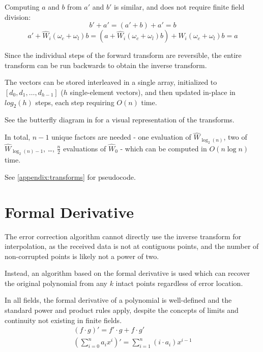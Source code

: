 Computing $a$ and $b$ from $a'$ and $b'$ is similar, and does not require finite field division:
\begin{equation}b' + a' = (a' + b) + a' = b\end{equation}
\begin{equation}a' + \hat{W}_i(\omega_c + \omega_l) b = (a + \hat{W}_i(\omega_c + \omega_l) b) + \hat{W}_i(\omega_c + \omega_l) b = a\end{equation}

Since the individual steps of the forward transform are reversible, the entire transform can be run backwards to obtain the inverse transform.

The vectors can be stored interleaved in a single array, initialized to $[d_0, d_1, \ldots, d_{h - 1}]$ ($h$ single-element vectors), and then updated in-place in $log_2(h)$ steps, each step requiring $O(n)$ time.

See the butterfly diagram in \cite{novel-poly} for a visual representation of the transforms.

In total, $n - 1$ unique factors are needed - one evaluation of $\hat{W}_{\log_2(n)}$, two of $\hat{W}_{\log_2(n) - 1}$, \ldots, $\frac{n}{2}$ evaluations of $\hat{W}_0$ - which can be computed in $O(n \log n)$ time.

See \ref{appendix:transforms} for pseudocode.

\section{Formal Derivative}

The error correction algorithm cannot directly use the inverse transform for interpolation, as the received data is not at contiguous points, and the number of non-corrupted points is likely not a power of two.

Instead, an algorithm based on the formal derivative is used which can recover the original polynomial from any $k$ intact points regardless of error location.

In all fields, the formal derivative of a polynomial is well-defined and the standard power and product rules apply, despite the concepts of limits and continuity not existing in finite fields.
\begin{gather*}
(f \cdot g)' = f' \cdot g + f \cdot g'\\
(\sum_{i = 0}^{n} a_i x^i)' = \sum_{i = 1}^{n} (i \cdot a_i) x^{i - 1}
\end{gather*}

